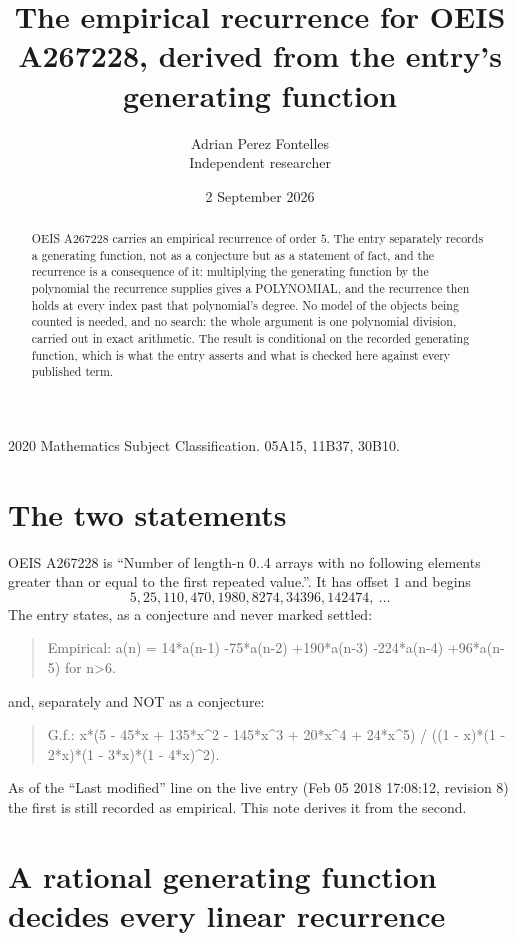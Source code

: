 \documentclass[11pt,a4paper]{article}
\title{The empirical recurrence for OEIS A267228, derived from the entry's generating function}
\author{Adrian Perez Fontelles\\ \small Independent researcher}
\date{2 September 2026}
\theoremstyle{plain}
\theoremstyle{definition}
\begin{document}
\maketitle

\begin{abstract}
OEIS A267228 carries an empirical recurrence of order $5$. The entry separately records a
generating function, not as a conjecture but as a statement of fact, and the recurrence is a
consequence of it: multiplying the generating function by the polynomial the recurrence
supplies gives a POLYNOMIAL, and the recurrence then holds at every index past that
polynomial's degree. No model of the objects being counted is needed, and no search: the
whole argument is one polynomial division, carried out in exact arithmetic. The result is
conditional on the recorded generating function, which is what the entry asserts and what is
checked here against every published term.
\end{abstract}

\noindent\small 2020 Mathematics Subject Classification. 05A15, 11B37, 30B10.\normalsize

\section{The two statements}

OEIS A267228 is ``Number of length-n 0..4 arrays with no following elements greater than or equal to the first repeated value.''. It has offset $1$ and begins
\[
5, 25, 110, 470, 1980, 8274, 34396, 142474,\ \dots
\]
The entry states, as a conjecture and never marked settled:
\begin{quote}
Empirical: a(n) = 14*a(n-1) -75*a(n-2) +190*a(n-3) -224*a(n-4) +96*a(n-5) for n>6.
\end{quote}
and, separately and NOT as a conjecture:
\begin{quote}
G.f.: x*(5 - 45*x + 135*x\^{}2 - 145*x\^{}3 + 20*x\^{}4 + 24*x\^{}5) / ((1 - x)*(1 - 2*x)*(1 - 3*x)*(1 - 4*x)\^{}2).
\end{quote}
As of the ``Last modified'' line on the live entry (Feb 05 2018 17:08:12, revision 8) the first is still
recorded as empirical. This note derives it from the second.

\section{A rational generating function decides every linear recurrence}
\end{document}
